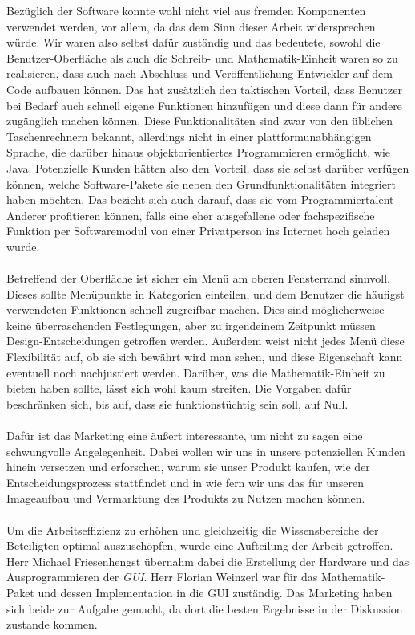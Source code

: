 Bezüglich der Software konnte wohl nicht viel aus fremden Komponenten verwendet werden, vor allem, da das dem Sinn dieser Arbeit widersprechen würde. Wir waren also selbst dafür zuständig und das bedeutete, sowohl die Benutzer-Oberfläche als auch die Schreib- und Mathematik-Einheit waren so zu realisieren, dass auch nach Abschluss und Veröffentlichung Entwickler auf dem Code aufbauen können. Das hat zusätzlich den taktischen Vorteil, dass Benutzer bei Bedarf auch schnell eigene Funktionen hinzufügen und diese dann für andere zugänglich machen können. Diese Funktionalitäten sind zwar von den üblichen Taschenrechnern bekannt, allerdings nicht in einer plattformunabhängigen Sprache, die darüber hinaus objektorientiertes Programmieren ermöglicht, wie Java.
Potenzielle Kunden hätten also den Vorteil, dass sie selbst darüber verfügen können, welche Software-Pakete sie neben den Grundfunktionalitäten integriert haben möchten. Das bezieht sich auch darauf, dass sie vom Programmiertalent Anderer profitieren können, falls eine eher ausgefallene oder fachspezifische Funktion per Softwaremodul von einer Privatperson ins Internet hoch geladen wurde.\\
\\
Betreffend der Oberfläche ist sicher ein Menü am oberen Fensterrand sinnvoll. Dieses sollte Menüpunkte in Kategorien einteilen, und dem Benutzer die häufigst verwendeten Funktionen schnell zugreifbar machen. Dies sind möglicherweise keine überraschenden Festlegungen, aber zu irgendeinem Zeitpunkt müssen Design-Entscheidungen getroffen werden. Außerdem weist nicht jedes Menü diese Flexibilität auf, ob sie sich bewährt wird man sehen, und diese Eigenschaft kann eventuell noch nachjustiert werden.
Darüber, was die Mathematik-Einheit zu bieten haben sollte, lässt sich wohl kaum streiten. Die Vorgaben dafür beschränken sich, bis auf, dass sie funktionstüchtig sein soll, auf Null.\\
\\
Dafür ist das Marketing eine äußert interessante, um nicht zu sagen eine schwungvolle Angelegenheit. Dabei wollen wir uns in unsere potenziellen Kunden hinein versetzen und erforschen, warum sie unser Produkt kaufen, wie der Entscheidungsprozess stattfindet und in wie fern wir uns das für unseren Imageaufbau und Vermarktung des Produkts zu Nutzen machen können.\\
\\
Um die Arbeitseffizienz zu erhöhen und gleichzeitig die Wissensbereiche der Beteiligten optimal auszuschöpfen, wurde eine Aufteilung der Arbeit getroffen. Herr Michael Friesenhengst übernahm dabei die Erstellung der Hardware und das Ausprogrammieren der \textit{GUI}. Herr Florian Weinzerl war für das Mathematik-Paket und dessen Implementation in die GUI zuständig. Das Marketing haben sich beide zur Aufgabe gemacht, da dort die besten Ergebnisse in der Diskussion zustande kommen.